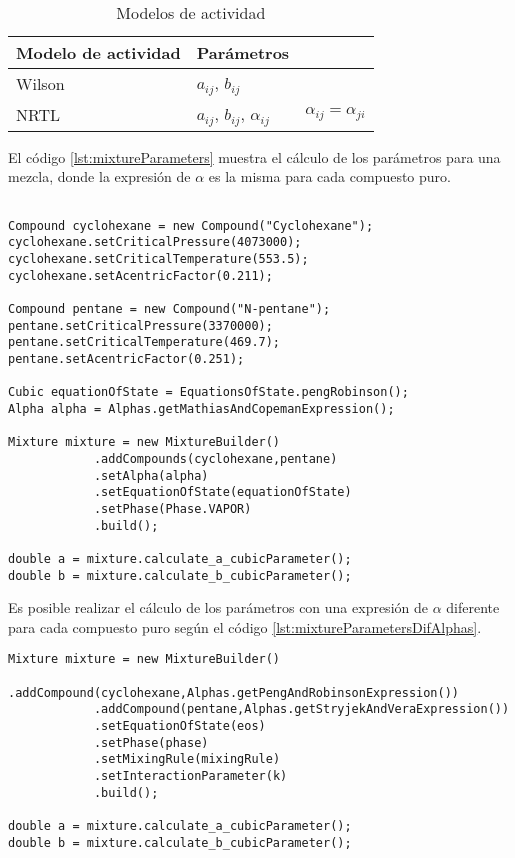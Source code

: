 \begin{table}
\begin{tabularx}{\textwidth}{|X|X|X|}
	\hline
	Modelo de actividad & Parámetros & \\
	\hline
	Wilson & $a_{ij}$, $b_{ij}$  & \\
	NRTL & $a_{ij}$, $b_{ij}$, $\alpha_{ij}$ & $\alpha_{ij} = \alpha_{ji}$ \\
	\hline
\end{tabularx}
\caption{Modelos de actividad }\label{tab:activitymodels}
\end{table}

El código \ref{lst:mixtureParameters} muestra el cálculo de los parámetros para una mezcla, donde la expresión de $\alpha$ es la misma para cada compuesto puro. 

\begin{lstlisting}[caption={Código para el cálculo de los parámetros de la ecuación de estado en una mezcla.}, label={lst:mixtureParameters} ]

Compound cyclohexane = new Compound("Cyclohexane");
cyclohexane.setCriticalPressure(4073000);
cyclohexane.setCriticalTemperature(553.5);
cyclohexane.setAcentricFactor(0.211);

Compound pentane = new Compound("N-pentane");
pentane.setCriticalPressure(3370000);
pentane.setCriticalTemperature(469.7);
pentane.setAcentricFactor(0.251);

Cubic equationOfState = EquationsOfState.pengRobinson();
Alpha alpha = Alphas.getMathiasAndCopemanExpression();

Mixture mixture = new MixtureBuilder()
			.addCompounds(cyclohexane,pentane)
			.setAlpha(alpha)
			.setEquationOfState(equationOfState)
			.setPhase(Phase.VAPOR)
			.build();

double a = mixture.calculate_a_cubicParameter();
double b = mixture.calculate_b_cubicParameter();
\end{lstlisting}

Es posible realizar el cálculo de los parámetros con una expresión de $\alpha$ diferente para cada compuesto puro según el código \ref{lst:mixtureParametersDifAlphas}. 


\begin{lstlisting}[caption={Código para el cálculo de los parámetros de la ecuación de estado en una mezcla, con diferentes expresiones de $\alpha$},label={lst:mixtureParametersDifAlphas}]
Mixture mixture = new MixtureBuilder()
			.addCompound(cyclohexane,Alphas.getPengAndRobinsonExpression())
			.addCompound(pentane,Alphas.getStryjekAndVeraExpression())
			.setEquationOfState(eos)
			.setPhase(phase)
			.setMixingRule(mixingRule)
			.setInteractionParameter(k)
			.build();

double a = mixture.calculate_a_cubicParameter();
double b = mixture.calculate_b_cubicParameter();
\end{lstlisting}
